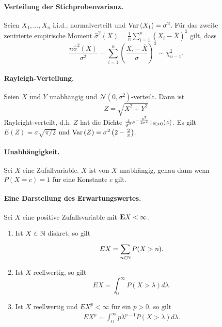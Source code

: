 \paragraph{Verteilung der Stichprobenvarianz. }
Seien $X_1, \ldots, X_n$ i.i.d., normalverteilt und $\operatorname{Var}\left( X_1 \right)=\sigma^2$.
Für das zweite zentrierte empirische  Moment 
$\hat \sigma^2 \left( X \right)= \frac{1}{n} \sum_{i=1}^{n} \left( X_i - \bar X \right)^2 $
gilt, dass
\begin{equation*}
    \frac{n \hat \sigma^2 \left( X \right)}{\sigma^2 } = 
        \sum_{i=1}^{n} \left( \frac{X_i - \bar X}{ \sigma} \right)^2 \sim \chi^2_{n-1}.
\end{equation*}


\paragraph{Rayleigh-Verteilung. }  Seien $X$ und $Y$ unabhängig und 
$\mathcal N (0, \sigma^2)$-verteilt. Dann ist
\begin{equation*}
    Z= \sqrt{X^2 + Y^2} 
\end{equation*}
Rayleight-verteilt, d.h. 
$Z$ hat die Dichte $\frac{z}{\sigma^2}e^{-\frac{z^2}{2\sigma^2}}1_{\mathbb R>0}(z)$.
Es gilt $E\left( Z \right) = \sigma \sqrt{\pi/2}$ und 
$\operatorname{Var}\left( Z \right) = \sigma^2 \left( 2 - \frac{2}{\pi} \right)$.



\paragraph{Unabhängigkeit.} 
Sei $X$ eine Zufallvariable. $X$ ist von $X$ unabhängig, genau dann wenn
$P(X = c)=1$ für eine Konstante $c$ gilt. \cite{jacod2003probability}

\paragraph{Eine Darstellung des Erwartungswertes. } Sei $X$ eine
positive Zufallsvariable mit $\mathbf{E} X < \infty$. 
\begin{enumerate}
    \item Ist $X \in \mathbb N$ diskret, so gilt
        \begin{equation}
            E X = \sum_{n\in\mathbb N}^{} P(X>n).
        \end{equation}
    \item Ist $X$ reellwertig, so gilt
        \begin{equation}
            E X = \int_{0}^{\infty} P(X>\lambda) d\lambda.
        \end{equation}
    \item Ist $X$ reellwertig und $E X^p<\infty$ für ein $p>0$, so gilt
        \begin{eqnarray}
            E X^p = \int_{0}^{\infty} p\lambda^{p-1} P(X>\lambda) d\lambda.
        \end{eqnarray}
\end{enumerate} 

